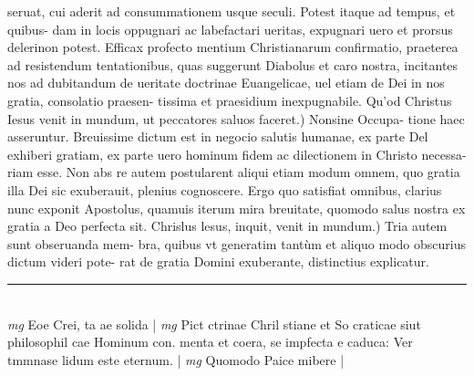 \documentclass{article}
\begin{document}
\begin{pages}
seruat, cui aderit ad consummationem usque seculi. Potest itaque ad tempus, et quibus- dam in locis oppugnari ac labefactari ueritas, expugnari uero et prorsus delerinon potest. Efficax profecto mentium Christianarum confirmatio, praeterea ad resistendum tentationibus, quas suggerunt Diabolus et caro nostra, incitantes nos ad dubitandum de ueritate doctrinae Euangelicae, uel etiam de Dei in nos gratia, consolatio praesen- tissima et praesidium inexpugnabile.  \pend\pstart Qu'od Christus Iesus venit in mundum, ut peccatores saluos faceret.) Nonsine Occupa- tione haec asseruntur. Breuissime dictum est in negocio salutis humanae, ex parte Del exhiberi gratiam, ex parte uero hominum fidem ac dilectionem in Christo necessa- riam esse. Non abs re autem postularent aliqui etiam modum omnem, quo gratia illa Dei sic exuberauit, plenius cognoscere. Ergo quo satisfiat omnibus, clarius nunc exponit Apostolus, quamuis iterum mira breuitate, quomodo salus nostra ex gratia a Deo perfecta sit.  \pend\pstart Chrislus lesus, inquit, venit in mundum.) Tria autem sunt obseruanda mem- bra, quibus vt generatim tantùm et aliquo modo obscurius dictum videri pote- rat de gratia Domini exuberante, distinctius explicatur.  \pend
\vspace{0.5cm}\noindent
\vspace{0.2cm}\rule{1cm}{0.2pt}\\ 
\hspace{0.2cm}\textit{mg}
\footnotesize Eoe Crei, ta ae solida 
\normalsize| 
\hspace{0.2cm}\textit{mg}
\footnotesize Pict ctrinae Chril stiane et So craticae siut philosophil cae Hominum con. menta et coera, se impfecta e caduca: Ver tmmnase lidum este eternum. 
\normalsize| 
\hspace{0.2cm}\textit{mg}
\footnotesize Quomodo Paice mibere 
\normalsize| 

\end{pages}
\end{document}
